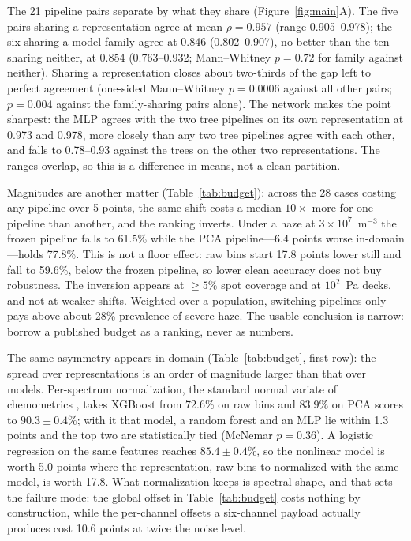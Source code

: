 \documentclass{article}
\begin{document}
The 21 pipeline pairs separate by what they share (Figure~\ref{fig:main}A). The five pairs sharing a representation agree at mean $\rho = 0.957$ (range 0.905--0.978); the six sharing a model family agree at 0.846 (0.802--0.907), no better than the ten sharing neither, at 0.854 (0.763--0.932; Mann--Whitney $p = 0.72$ for family against neither). Sharing a representation closes about two-thirds of the gap left to perfect agreement (one-sided Mann--Whitney $p = 0.0006$ against all other pairs; $p = 0.004$ against the family-sharing pairs alone). The network makes the point sharpest: the MLP agrees with the two tree pipelines on its own representation at 0.973 and 0.978, more closely than any two tree pipelines agree with each other, and falls to 0.78--0.93 against the trees on the other two representations. The ranges overlap, so this is a difference in means, not a clean partition.

Magnitudes are another matter (Table~\ref{tab:budget}): across the 28 cases costing any pipeline over 5 points, the same shift costs a median $10\times$ more for one pipeline than another, and the ranking inverts. Under a haze at $3 \times 10^{7}$~m$^{-3}$ the frozen pipeline falls to 61.5\% while the PCA pipeline---6.4 points worse in-domain---holds 77.8\%. This is not a floor effect: raw bins start 17.8 points lower still and fall to 59.6\%, below the frozen pipeline, so lower clean accuracy does not buy robustness. The inversion appears at $\geq 5\%$ spot coverage and at $10^{2}$~Pa decks, and not at weaker shifts. Weighted over a population, switching pipelines only pays above about 28\% prevalence of severe haze. The usable conclusion is narrow: borrow a published budget as a ranking, never as numbers.

The same asymmetry appears in-domain (Table~\ref{tab:budget}, first row): the spread over representations is an order of magnitude larger than that over models. Per-spectrum normalization, the standard normal variate of chemometrics \citep{barnes1989}, takes XGBoost from 72.6\% on raw bins and 83.9\% on PCA scores to $90.3 \pm 0.4\%$; with it that model, a random forest and an MLP lie within 1.3 points and the top two are statistically tied (McNemar $p = 0.36$). A logistic regression on the same features reaches $85.4 \pm 0.4\%$, so the nonlinear model is worth 5.0 points where the representation, raw bins to normalized with the same model, is worth 17.8. What normalization keeps is spectral shape, and that sets the failure mode: the global offset in Table~\ref{tab:budget} costs nothing by construction, while the per-channel offsets a six-channel payload actually produces cost 10.6 points at twice the noise level.
\end{document}
